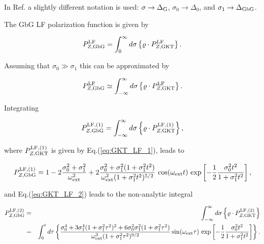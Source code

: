 \documentclass[twoside]{article}
\begin{document}
\noindent In Ref.\cite{yaouanc2011} a slightly different notation is used: $\sigma \to \Delta_{\rm G}$,  $\sigma_0 \to \Delta_{0}$, and 
$\sigma_1 \to \Delta_{\rm GbG}$.

\noindent The GbG LF polarization function is given by

\begin{equation}
 P_{Z,{\rm GbG}}^{\rm LF} = \int_0^\infty d\sigma \left\{ \varrho \cdot P_{Z,{\rm GKT}}^{\rm LF} \right\}.
\end{equation}

\noindent Assuming that $\sigma_0 \gg \sigma_1$ this can be approximated by

\begin{equation}
 P_{Z,{\rm GbG}}^{\rm LF} \simeq \int_{-\infty}^\infty d\sigma \left\{ \varrho \cdot P_{Z,{\rm GKT}}^{\rm LF} \right\}.
\end{equation}

\noindent Integrating 

\begin{equation*}
 P_{Z,{\rm GbG}}^{\rm LF, (1)} = \int_{-\infty}^\infty d\sigma \left\{ \varrho \cdot P_{Z,{\rm GKT}}^{\rm LF, (1)} \right\},  
\end{equation*}

\noindent where $P_{Z,{\rm GKT}}^{\rm LF, (1)}$ is given by Eq.(\ref{eq:GKT_LF_1}), leads to 

\begin{equation}\label{eq:GbG_LF_1}
 P_{Z,{\rm GbG}}^{\rm LF, (1)} = 1 - 2 \frac{\sigma_0^2+\sigma_1^2}{\omega_{\rm ext}^2} + 
      2 \frac{\sigma_0^2 + \sigma_1^2 (1 + \sigma_1^2 t^2)}{\omega_{\rm ext}^2 (1 + \sigma_1^2 t^2)^{5/2}}\, \cos(\omega_{\rm ext} t)\,
      \exp\left[-\frac{1}{2} \frac{\sigma_0^2 t^2}{1+\sigma_1^2 t^2}\right],
\end{equation}

\noindent and Eq.(\ref{eq:GKT_LF_2}) leads to the non-analytic integral

\begin{eqnarray}
  P_{Z,{\rm GbG}}^{\rm LF, (2)} &=& \int_{-\infty}^\infty d\sigma \left\{ \varrho \cdot P_{Z,{\rm GKT}}^{\rm LF, (2)} \right\} \nonumber \\
    &=& \int_0^t d\tau \left\{ \frac{\sigma_0^4 + 3 \sigma_1^4 (1 + \sigma_1^2 \tau^2)^2 + 6 \sigma_0^2 \sigma_1^2 (1+\sigma_1^2 \tau^2)}{\omega_{\rm ext}^3 (1+\sigma_1^2 \tau^2)^{9/2}} 
   \sin(\omega_{\rm ext} \tau)\, \exp\left[-\frac{1}{2} \frac{\sigma_0^2 t^2}{1+\sigma_1^2 t^2}\right] \right\}. \label{eq:GbG_LF_2}
\end{eqnarray}
\end{document}

